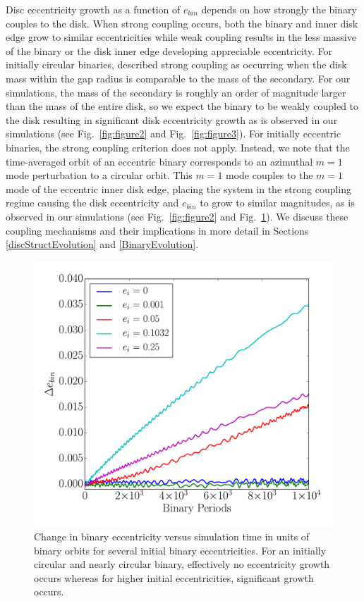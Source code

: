 Disc eccentricity growth as a function of $e_{bin}$ depends on how strongly the binary couples to the disk.  When strong coupling occurs, both the binary and inner disk edge grow to similar eccentricities while weak coupling results in the less massive of the binary or the disk inner edge developing appreciable eccentricity.  For initially circular binaries, \citet{Papaloizou01} described strong coupling as occurring when the disk mass within the gap radius is comparable to the mass of the secondary.  For our simulations, the mass of the secondary is roughly an order of magnitude larger than the mass of the entire disk, so we expect the binary to be weakly coupled to the disk resulting in significant disk eccentricity growth as is observed in our simulations (see Fig.~\ref{fig:figure2} and Fig.~\ref{fig:figure3}).  For initially eccentric binaries, the \citet{Papaloizou01} strong coupling criterion does not apply.  Instead, we note that the time-averaged orbit of an eccentric binary corresponds to an azimuthal $m = 1$ mode perturbation to a circular orbit.  This $m = 1$ mode couples to the $m = 1$ mode of the eccentric inner disk edge, placing the system in the strong coupling regime causing the disk eccentricity and $e_{bin}$ to grow to similar magnitudes, as is observed in our simulations (see Fig.~\ref{fig:figure2} and Fig.~\ref{fig:figure4}).  We discuss these coupling mechanisms and their implications in more detail in Sections \ref{discStructEvolution} and \ref{BinaryEvolution}.

\begin{figure}
	\includegraphics[width=\columnwidth]{f4}
    \caption{Change in binary eccentricity versus simulation time in units of binary orbits for several initial
binary eccentricities. For an initially circular and nearly circular binary, effectively no eccentricity growth occurs whereas 
for higher initial eccentricities, significant growth occurs.}
    \label{fig:figure4}
\end{figure}

